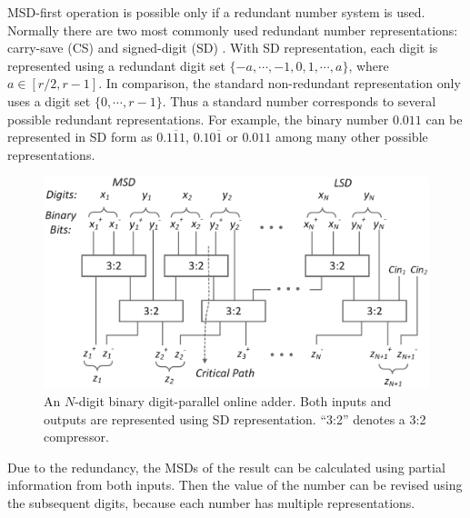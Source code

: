 \documentclass[conference]{IEEEtran}
\begin{document}
MSD-first operation is possible only if a redundant number system is used. Normally there are two most commonly used redundant number representations: carry-save (CS) \cite{CSadder} and signed-digit (SD) \cite{RedundantNumber}. With SD representation, each digit is represented using a redundant digit set $\{-a, \cdots,-1,0, 1, \cdots, a\}$, where $a\in[r/2,r-1]$. In comparison, the standard non-redundant representation only uses a digit set $\{0,\cdots,r-1\}$. Thus a standard number corresponds to several possible redundant representations. For example, the binary number $0.011$ can be represented in SD form as $0.1\overline{1}1$, $0.10\overline{1}$ or $0.011$ among many other possible representations.\vspace{-0.5ex}
%
\vspace{-.5ex}
\begin{figure}[tbp]
  \centering
  \includegraphics[width=.5\textwidth]{./Figures/SDAdder.eps}
    \vspace{-7ex}
  \caption{An $N$-digit binary digit-parallel online adder. Both inputs and outputs are represented using SD representation. ``3:2'' denotes a 3:2 compressor.}
    \vspace{-2ex}
  \label{Fig:Radix2SD_adder}
\end{figure}

Due to the redundancy, the MSDs of the result can be calculated using partial information from both inputs. Then the value of the number can be revised using the subsequent digits, because each number has multiple representations.\vspace{-0.5ex}
\end{document}
